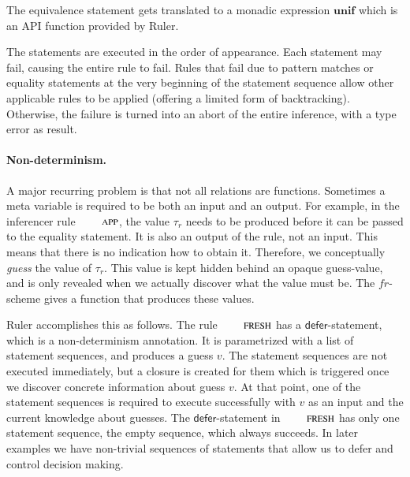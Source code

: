 \documentclass[preprint,natbib]{sigplanconf}
\newcommand{\Varid}[1]{\mathit{#1}}
\newcommand\Defer{\mathsf{defer}}
\begin{document}
    The equivalence statement gets translated to a monadic expression \ensuremath{\mathbf{unif}} which is an API function provided by Ruler.

    The statements are executed in the order of appearance.
    Each statement may fail, causing the entire rule to fail. Rules that fail due to pattern matches or equality statements at the very beginning
    of the statement sequence allow other applicable rules to be applied (offering a limited form of backtracking). Otherwise, the failure
    is turned into an abort of the entire inference, with a type error as result.

    \paragraph{Non-determinism.}

    A major recurring problem is that not all relations are
    functions. Sometimes a meta variable is required to be both an
    input and an output.  For example, in the inferencer rule
    $\RefTirName{APP}$, the value $\tau_r$ needs to be produced before
    it can be passed to the equality statement. It is also an output
    of the rule, not an input. This means that there is no indication
    how to obtain it.  Therefore, we conceptually {\it guess}
    the value of $\tau_r$. This value is kept hidden behind an opaque
    guess-value, and is only revealed when we actually discover what
    the value must be. The \ensuremath{\Varid{fr}}-scheme gives a function that
    produces these values.

    Ruler accomplishes this as follows. The rule $\RefTirName{FRESH}$
    has a $\Defer$-statement, which is a non-determinism
    annotation. It is parametrized with a list of statement
    sequences, and produces a guess $v$. The statement sequences are
    not executed immediately, but a closure is created for them which
    is triggered once we discover concrete information about guess
    $v$. At that point, one of the statement sequences is required to
    execute successfully with $v$ as an input and the current
    knowledge about guesses. The $\Defer$-statement in
    $\RefTirName{FRESH}$ has only one statement sequence, the empty
    sequence, which always succeeds. In later examples we have
    non-trivial sequences of statements that allow us to defer and
    control decision making.
\end{document}
